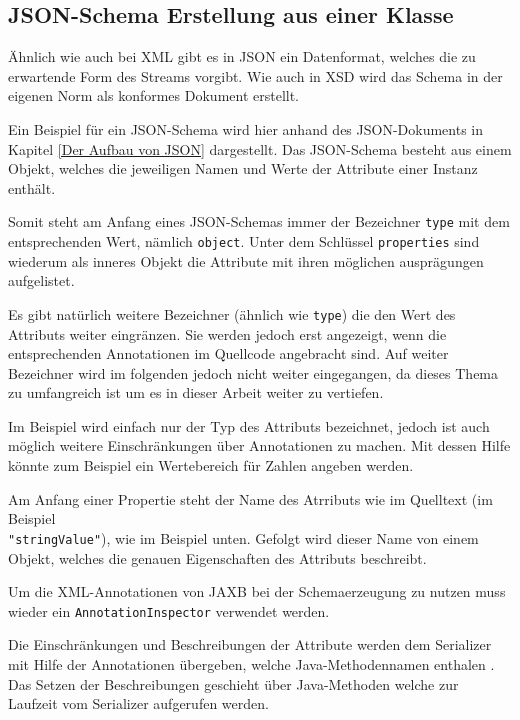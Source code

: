 \subsection{JSON-Schema Erstellung aus einer Klasse}\label{JSON-Schema}
\"Ahnlich wie auch bei XML gibt es in JSON ein Datenformat, welches die zu erwartende Form des Streams vorgibt.
Wie auch in XSD wird das Schema in der eigenen Norm als konformes Dokument erstellt. \cite{JSON_Schema}

Ein Beispiel f\"ur ein JSON-Schema wird hier anhand des JSON-Dokuments in Kapitel \ref{Der Aufbau von JSON} dargestellt.
Das JSON-Schema besteht aus einem Objekt, welches die jeweiligen Namen und Werte der Attribute einer Instanz enth\"alt.

Somit steht am Anfang eines JSON-Schemas immer der Bezeichner \texttt{type} mit dem entsprechenden Wert, n\"amlich \texttt{object}.
Unter dem Schl\"ussel \texttt{properties} sind wiederum als inneres Objekt die Attribute mit ihren m\"oglichen auspr\"agungen aufgelistet. 

Es gibt nat\"urlich weitere Bezeichner (\"ahnlich wie \texttt{type}) die den Wert des Attributs weiter eingr\"anzen. Sie werden jedoch erst angezeigt, wenn die entsprechenden Annotationen im Quellcode angebracht sind. Auf weiter Bezeichner wird im folgenden jedoch nicht weiter eingegangen, da dieses Thema zu umfangreich ist um es in dieser Arbeit weiter zu vertiefen.

Im Beispiel wird einfach nur der Typ des Attributs bezeichnet, jedoch ist auch m\"oglich weitere Einschr\"ankungen \"uber Annotationen zu machen. Mit dessen Hilfe k\"onnte zum Beispiel ein Wertebereich f\"ur Zahlen angeben werden.

Am Anfang einer Propertie steht der Name des Atrributs wie im Quelltext (im Beispiel \\\texttt{"}\texttt{stringValue"}), wie im Beispiel unten.
Gefolgt wird dieser Name von einem Objekt, welches die genauen Eigenschaften des Attributs beschreibt.


Um die XML-Annotationen von JAXB bei der Schemaerzeugung zu nutzen muss wieder ein \texttt{AnnotationInspector} verwendet werden.

Die Einschr\"ankungen und Beschreibungen der Attribute werden dem Serializer mit Hilfe der Annotationen \"ubergeben, welche Java-Methodennamen enthalen . Das Setzen der Beschreibungen geschieht \"uber Java-Methoden welche zur Laufzeit vom Serializer aufgerufen werden.


